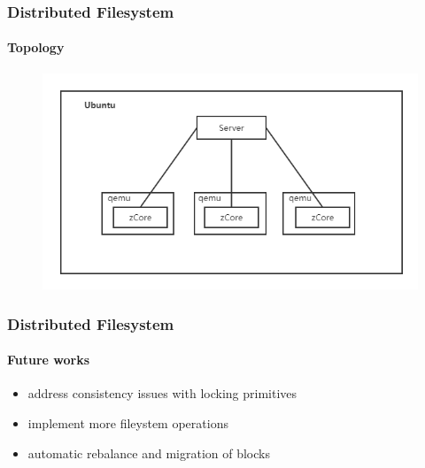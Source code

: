 \documentclass{ctexbeamer}
\begin{document}
\begin{frame}
\frametitle{Distributed Filesystem}
\framesubtitle{Topology}
\begin{figure}
  \includegraphics[width=\textwidth]{./images/image1.png}
\end{figure}
\end{frame}

\begin{frame}
\frametitle{Distributed Filesystem}
\framesubtitle{Future works}
  \begin{itemize}
    \item address consistency issues with locking primitives
    \item implement more fileystem operations
    \item automatic rebalance and migration of blocks
  \end{itemize}
\end{frame}

\section{}
\frame{\titlepage}
\end{document}
